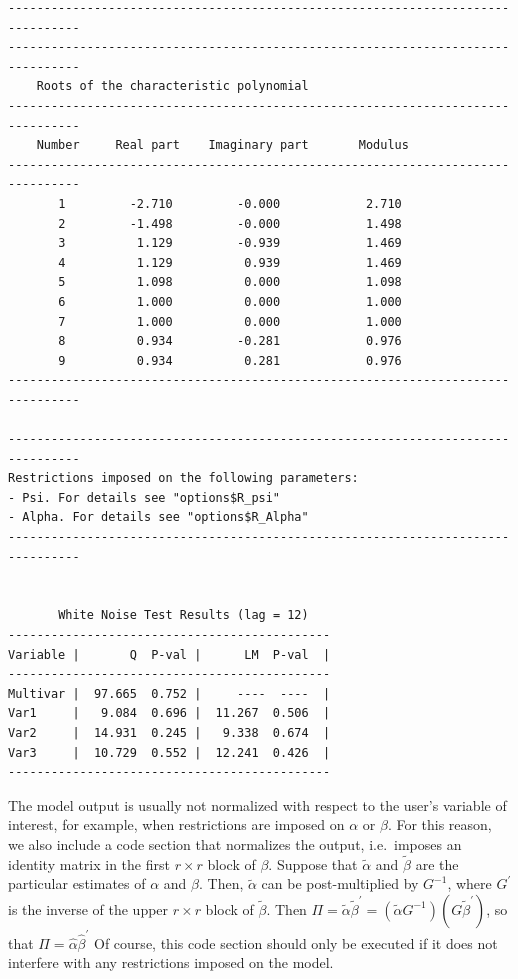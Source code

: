 \documentclass[article]{jss}
\begin{document}
\begin{verbatim}
--------------------------------------------------------------------------------
--------------------------------------------------------------------------------
    Roots of the characteristic polynomial                                                           
--------------------------------------------------------------------------------
    Number     Real part    Imaginary part       Modulus                                             
--------------------------------------------------------------------------------
       1         -2.710         -0.000            2.710                                        
       2         -1.498         -0.000            1.498                                        
       3          1.129         -0.939            1.469                                        
       4          1.129          0.939            1.469                                        
       5          1.098          0.000            1.098                                        
       6          1.000          0.000            1.000                                        
       7          1.000          0.000            1.000                                        
       8          0.934         -0.281            0.976                                        
       9          0.934          0.281            0.976                                        
--------------------------------------------------------------------------------

--------------------------------------------------------------------------------
Restrictions imposed on the following parameters:
- Psi. For details see "options$R_psi"
- Alpha. For details see "options$R_Alpha"
--------------------------------------------------------------------------------


       White Noise Test Results (lag = 12)
---------------------------------------------
Variable |       Q  P-val |      LM  P-val  |
---------------------------------------------
Multivar |  97.665  0.752 |     ----  ----  |
Var1     |   9.084  0.696 |  11.267  0.506  |
Var2     |  14.931  0.245 |   9.338  0.674  |
Var3     |  10.729  0.552 |  12.241  0.426  |
---------------------------------------------
\end{verbatim}

The model output is usually not normalized with respect to the user's variable of interest, for example, 
when restrictions are imposed on $\alpha$ or $\beta$. 
For this reason, we also include a code section that normalizes the output, 
i.e.\ imposes an identity matrix in the first $r \times r$ block of $\beta$. 
Suppose that $\tilde{\alpha}$ and $\tilde{\beta}$ are the particular estimates of $\alpha$ and $\beta$. 
Then, $\tilde{\alpha}$ can be post-multiplied by $G^{-1}$, where $G^{\prime}$ is the inverse of the 
upper $r \times r$ block of $\tilde{\beta}$. 
Then $\Pi= \tilde{\alpha}  \tilde{\beta}^{\prime} = (\tilde{\alpha}G^{-1}) (G\tilde{\beta}^{\prime})$, 
so that $\Pi= \hat{\alpha}\hat{\beta}^{\prime}$
Of course, this code section should only be executed if it does not interfere with any restrictions imposed on the model. 
\end{document}
